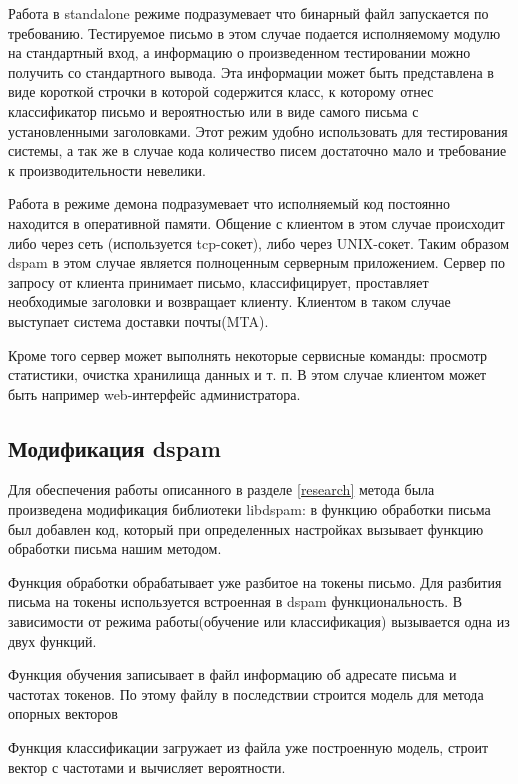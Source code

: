 Работа в standalone режиме подразумевает что бинарный файл запускается по требованию. Тестируемое письмо в этом случае подается исполняемому модулю на стандартный вход, а информацию о произведенном тестировании можно
получить со стандартного вывода. Эта информации может быть представлена в виде короткой строчки в которой содержится класс, к которому отнес классификатор письмо и вероятностью или в виде самого письма с установленными заголовками. Этот режим удобно использовать для тестирования системы, а так же в случае кода количество писем достаточно мало и требование к производительности невелики.

Работа в режиме демона подразумевает что исполняемый код постоянно находится в оперативной памяти. Общение с клиентом в этом случае происходит либо через сеть (используется tcp-сокет), либо через UNIX-сокет. Таким образом dspam в этом случае является полноценным серверным приложением. Сервер по запросу от клиента принимает письмо, классифицирует, проставляет необходимые заголовки и возвращает клиенту. Клиентом в таком случае выступает система доставки почты(MTA).

Кроме того сервер может выполнять некоторые сервисные команды: просмотр статистики, очистка хранилища данных и т. п. В этом случае клиентом может быть например web-интерфейс администратора.


\subsection{Модификация dspam}
Для обеспечения работы описанного в разделе \ref{research} метода была произведена модификация библиотеки libdspam: в функцию обработки письма был добавлен код, который при определенных настройках вызывает функцию обработки письма нашим методом.

Функция обработки обрабатывает уже разбитое на токены письмо. Для разбития письма на токены используется встроенная в dspam функциональность. В зависимости от режима работы(обучение или классификация) вызывается одна из двух функций.

Функция обучения записывает в файл информацию об адресате письма и частотах токенов. По этому файлу в последствии строится модель для метода опорных векторов

Функция классификации загружает из файла уже построенную модель, строит вектор с частотами и вычисляет вероятности.


